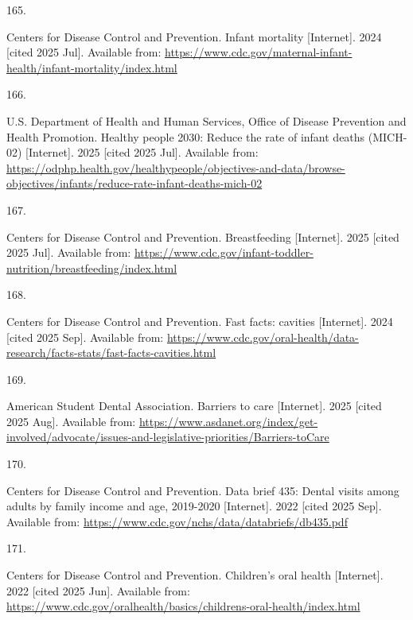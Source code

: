 \documentclass[
  english,
  letterpaper,
]{report}
\newlength{\cslhangindent}
\newlength{\csllabelwidth}
\newenvironment{CSLReferences}[2] %
 {\begin{list}{}{%
  \setlength{\itemindent}{0pt}
  \setlength{\leftmargin}{0pt}
  \setlength{\parsep}{0pt}
  \ifodd #1
   \setlength{\leftmargin}{\cslhangindent}
   \setlength{\itemindent}{-1\cslhangindent}
  \fi
  \setlength{\itemsep}{#2\baselineskip}}}
 {\end{list}}
\newcommand{\CSLLeftMargin}[1]{\parbox[t]{\csllabelwidth}{\strut#1\strut}}
\newcommand{\CSLRightInline}[1]{\parbox[t]{\linewidth - \csllabelwidth}{\strut#1\strut}}
\begin{document}
\begin{CSLReferences}{0}{1}
\CSLLeftMargin{165. }%
\CSLRightInline{Centers for Disease Control and Prevention. Infant
mortality {[}Internet{]}. 2024 {[}cited 2025 Jul{]}. Available from:
\url{https://www.cdc.gov/maternal-infant-health/infant-mortality/index.html}}

\CSLLeftMargin{166. }%
\CSLRightInline{U.S. Department of Health and Human Services, Office of
Disease Prevention and Health Promotion. Healthy people 2030: Reduce the
rate of infant deaths (MICH-02) {[}Internet{]}. 2025 {[}cited 2025
Jul{]}. Available from:
\url{https://odphp.health.gov/healthypeople/objectives-and-data/browse-objectives/infants/reduce-rate-infant-deaths-mich-02}}

\CSLLeftMargin{167. }%
\CSLRightInline{Centers for Disease Control and Prevention.
Breastfeeding {[}Internet{]}. 2025 {[}cited 2025 Jul{]}. Available from:
\url{https://www.cdc.gov/infant-toddler-nutrition/breastfeeding/index.html}}

\CSLLeftMargin{168. }%
\CSLRightInline{Centers for Disease Control and Prevention. Fast facts:
cavities {[}Internet{]}. 2024 {[}cited 2025 Sep{]}. Available from:
\url{https://www.cdc.gov/oral-health/data-research/facts-stats/fast-facts-cavities.html}}

\CSLLeftMargin{169. }%
\CSLRightInline{American Student Dental Association. Barriers to care
{[}Internet{]}. 2025 {[}cited 2025 Aug{]}. Available from:
\url{https://www.asdanet.org/index/get-involved/advocate/issues-and-legislative-priorities/Barriers-toCare}}

\CSLLeftMargin{170. }%
\CSLRightInline{Centers for Disease Control and Prevention. Data brief
435: Dental visits among adults by family income and age, 2019-2020
{[}Internet{]}. 2022 {[}cited 2025 Sep{]}. Available from:
\url{https://www.cdc.gov/nchs/data/databriefs/db435.pdf}}

\CSLLeftMargin{171. }%
\CSLRightInline{Centers for Disease Control and Prevention. Children's
oral health {[}Internet{]}. 2022 {[}cited 2025 Jun{]}. Available from:
\url{https://www.cdc.gov/oralhealth/basics/childrens-oral-health/index.html}}


\end{CSLReferences}
\end{document}
